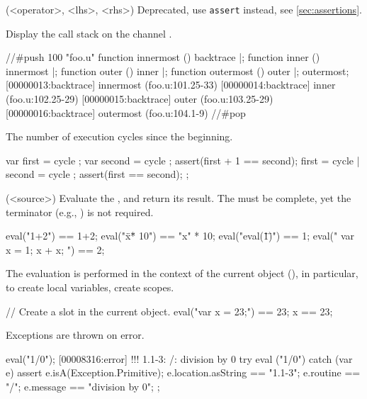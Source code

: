 \begin{urbiscriptapi}
\item[assert_op](<operator>, <lhs>, <rhs>)%
  Deprecated, use \lstinline|assert| instead, see \autoref{sec:assertions}.


\item[backtrace]%
  Display the call stack on the channel . \experimental
\begin{urbiscript}
//#push 100 "foo.u"
function innermost () { backtrace }|;
function inner ()     { innermost }|;
function outer ()     { inner }|;
function outermost () { outer }|;
outermost;
[00000013:backtrace] innermost (foo.u:101.25-33)
[00000014:backtrace] inner (foo.u:102.25-29)
[00000015:backtrace] outer (foo.u:103.25-29)
[00000016:backtrace] outermost (foo.u:104.1-9)
//#pop
\end{urbiscript}






\item[cycle]%
  The number of execution cycles since the beginning. \experimental
\begin{urbiscript}
{
  var first = cycle ; var second = cycle ;
  assert(first + 1 == second);
  first = cycle | second = cycle ;
  assert(first == second);
};
\end{urbiscript}


\item[eval](<source>)%
  Evaluate the \us {}, and return its result.  The
   must be complete, yet the terminator (e.g., \samp{;})
  is not required.
\begin{urbiassert}
eval("1+2") == 1+2;
eval("\"x\" * 10") == "x" * 10;
eval("eval(\"1\")") == 1;
eval("{ var x = 1; x + x; }") == 2;
\end{urbiassert}

  The evaluation is performed in the context of the current object
  (\this), in particular, to create local variables, create
  scopes.
\begin{urbiassert}
// Create a slot in the current object.
eval("var x = 23;") == 23;
x == 23;
\end{urbiassert}

  Exceptions are thrown on error.
\begin{urbiscript}
eval("1/0");
[00008316:error] !!! 1.1-3: /: division by 0
try
{
  eval ("1/0")
}
catch (var e)
{
  assert
  {
    e.isA(Exception.Primitive);
    e.location.asString  == "1.1-3";
    e.routine            == "/";
    e.message            == "division by 0";
  }
};
\end{urbiscript}



\end{urbiscriptapi}
